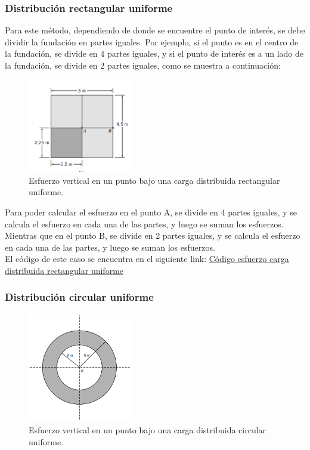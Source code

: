 \documentclass{article} %
\begin{document}
\subsubsection*{Distribución rectangular uniforme}
Para este método, dependiendo de donde se encuentre el punto de interés, se debe dividir la fundación en partes iguales. Por ejemplo, si el punto es en el centro de la fundación, se divide en 4 partes iguales, y si el punto de interés es a un lado de la fundación, se divide en 2 partes iguales, como se muestra a continuación:
\begin{figure}[h]
    \centering
    \includegraphics[width=0.4\textwidth]{Graficos/distribucion_rectangular.PNG}
    \caption{Esfuerzo vertical en un punto bajo una carga distribuida rectangular uniforme.}
    \label{fig:distribucion_rectangular}
\end{figure}
Para poder calcular el esfuerzo en el punto A, se divide en 4 partes iguales, y se calcula el esfuerzo en cada una de las partes, y luego se suman los esfuerzos. Mientras que en el punto B, se divide en 2 partes iguales, y se calcula el esfuerzo en cada una de las partes, y luego se suman los esfuerzos. \\
El código de este caso se encuentra en el siguiente link: \href{https://github.com/berckanala/Fundaciones_P2/blob/main/Codigos/python/incremento_tensiones.py}{Código esfuerzo carga distribuida rectangular uniforme}\\
\newpage

\subsubsection*{Distribución circular uniforme}
\begin{figure}[h]
    \centering
    \includegraphics[width=0.4\textwidth]{Graficos/Carga_circular.PNG}
    \caption{Esfuerzo vertical en un punto bajo una carga distribuida circular uniforme.}
    \label{fig:distribucion_circular}
\end{figure}
\end{document}
